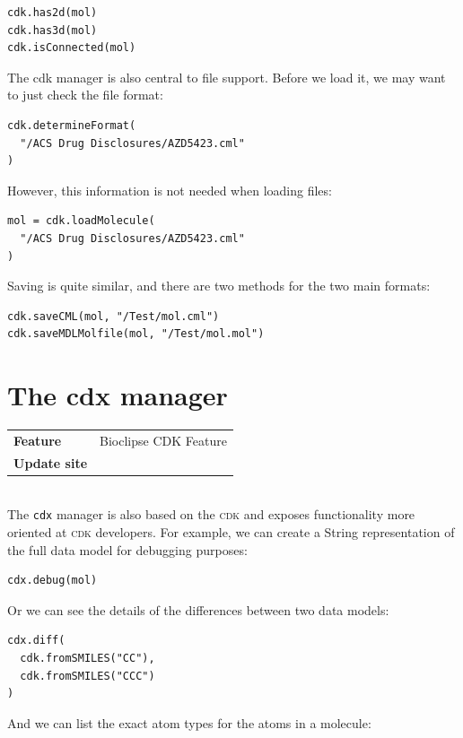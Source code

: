 \documentclass[a5paper, 10pt]{memoir}
\begin{document}
\begin{refsection}
\begin{Verbatim}
cdk.has2d(mol)
cdk.has3d(mol)
cdk.isConnected(mol)
\end{Verbatim}
The cdk manager is also central to file support. Before we load it, we may want
to just check the file format:

\begin{Verbatim}
cdk.determineFormat(
  "/ACS Drug Disclosures/AZD5423.cml"
)
\end{Verbatim}
However, this information is not needed when loading files:

\begin{Verbatim}
mol = cdk.loadMolecule(
  "/ACS Drug Disclosures/AZD5423.cml"
)
\end{Verbatim}
Saving is quite similar, and there are two methods for the two main formats:

\begin{Verbatim}
cdk.saveCML(mol, "/Test/mol.cml")
cdk.saveMDLMolfile(mol, "/Test/mol.mol")
\end{Verbatim}

\section{The cdx manager}


\begin{tabular}{ll}
\textbf{Feature} & Bioclipse CDK Feature \\
\textbf{Update site} & \url{} \\
\end{tabular} \\

\noindent
The \texttt{cdx} manager is also based on the \textsc{cdk} and exposes
functionality more oriented at \textsc{cdk} developers. For example, we can
create a String representation of the full data model for debugging
purposes:

\begin{Verbatim}
cdx.debug(mol)
\end{Verbatim}
Or we can see the details of the differences between two data
models:

\begin{Verbatim}
cdx.diff(
  cdk.fromSMILES("CC"),
  cdk.fromSMILES("CCC")
)
\end{Verbatim}
And we can list the exact atom types for the atoms in a
molecule:


\end{refsection}
\end{document}
